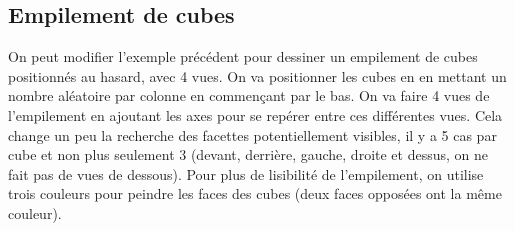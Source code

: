 \subsection{Empilement de cubes}

On peut modifier l'exemple précédent pour dessiner un empilement de cubes positionnés au hasard, avec 4 vues. On va positionner les cubes en en mettant un nombre aléatoire par colonne en commençant par le bas. On va faire 4 vues de l'empilement en ajoutant les axes pour se repérer entre ces différentes vues. Cela change un peu la recherche des facettes potentiellement visibles, il y a 5 cas par cube et non plus seulement 3 (devant, derrière, gauche, droite et dessus, on ne fait pas de vues de dessous). Pour plus de lisibilité de l'empilement, on utilise trois couleurs pour peindre les faces des cubes (deux faces opposées ont la même couleur).

